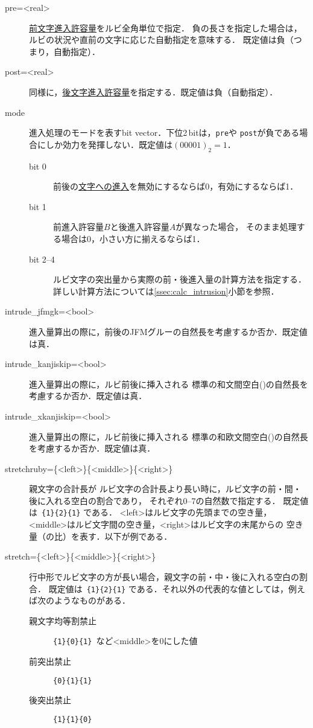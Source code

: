 \documentclass[a4paper,10ptj]{ltjsarticle}
\begin{document}
\begin{description}
\def\makelabel#1{\ttfamily\bfseries #1}
\item[pre=<real>] \underline{前文字進入許容量}をルビ全角単位で指定．
負の長さを指定した場合は，ルビの状況や直前の文字に応じた自動指定を意味する．
既定値は負（つまり，自動指定）．

\item[post=<real>] 同様に，\underline{後文字進入許容量}を指定する．既定値は負（自動指定）．

\item[mode] 進入処理のモードを表すbit vector．下位2\,bitは，\texttt{pre}や
\texttt{post}が負である場合にしか効力を発揮しない．既定値は$(00001)_2 = 1$．
\begin{description}
 \item[bit 0] 前後の\underline{文字への進入}を無効にするならば0，有効にするならば1．
 \item[bit 1] 前進入許容量$B$と後進入許容量$A$が異なった場合，
  そのまま処理する場合は0，小さい方に揃えるならば1．
 \item[bit 2--4] ルビ文字の突出量から実際の前・後進入量の計算方法を指定する．
  詳しい計算方法については\ref{ssec:calc_intrusion}\nobreak 小節を参照．
\end{description}
\item[intrude\_jfmgk=<bool>] 進入量算出の際に，前後のJFMグルーの自然長を考慮するか否か．既定値は真．
\item[intrude\_kanjiskip=<bool>] 進入量算出の際に，ルビ前後に挿入される
  標準の和文間空白()の自然長を
  考慮するか否か．既定値は真．
\item[intrude\_xkanjiskip=<bool>] 進入量算出の際に，ルビ前後に挿入される
  標準の和欧文間空白()の自然長を考慮するか否か．既定値は真．
\item[stretchruby=\{<left>\}\{<middle>\}\{<right>\}] 親文字の合計長が
ルビ文字の合計長より長い時に，ルビ文字の前・間・後に入れる空白の割合であり，
それぞれ0--7の自然数で指定する．
既定値は\ \verb+{1}{2}{1}+ である．
<left>はルビ文字の先頭までの空き量，<middle>はルビ文字間の空き量，<right>はルビ文字の末尾からの
空き量（の比）を表す．以下が例である．
\begin{LTXexample}[width=0.3\textwidth, preset=\Large]
\end{LTXexample}
\item[stretch=\{<left>\}\{<middle>\}\{<right>\}]
行中形でルビ文字の方が長い場合，親文字の前・中・後に入れる空白の割合．
既定値は\ \verb+{1}{2}{1}+ である．それ以外の代表的な値としては，例えば次のようなものがある．
\begin{description}
\item[親文字均等割禁止] \verb+{1}{0}{1}+\ など<middle>を0にした値
\item[前突出禁止] \verb+{0}{1}{1}+
\item[後突出禁止] \verb+{1}{1}{0}+
\end{description}


\end{description}
\end{document}
